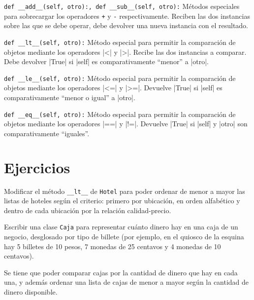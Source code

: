 \begin{referencia_python}
\begin{sintaxis}{\lstinline!def __add__(self, otro):, def __sub__(self, otro):!}
Métodos especiales para sobrecargar los operadores \lstinline!+! y
\lstinline!-! respectivamente.  Reciben las dos instancias sobre las
que se debe operar, debe devolver una nueva instancia con el
resultado.
\end{sintaxis}

\begin{sintaxis}{\lstinline!def __lt__(self, otro):!}
Método especial para permitir la comparación de objetos mediante los
operadores |<| y |>|.  Recibe las dos instancias a
comparar. Debe devolver |True| si |self| es comparativamente
``menor'' a |otro|.
\end{sintaxis}

\begin{sintaxis}{\lstinline!def __le__(self, otro):!}
Método especial para permitir la comparación de objetos mediante los
operadores |<=| y |>=|. Devuelve |True| si |self| es comparativamente
``menor o igual'' a |otro|.
\end{sintaxis}

\begin{sintaxis}{\lstinline!def __eq__(self, otro):!}
Método especial para permitir la comparación de objetos mediante los operadores
|==| y |!=|. Devuelve |True| si |self| y |otro| son comparativamente
``iguales''.
\end{sintaxis}

\end{referencia_python}

\newpage
\section{Ejercicios}

\begin{ejercicio}
Modificar el método \lstinline!__lt__! de \lstinline!Hotel!
para poder ordenar de menor a mayor las listas de hoteles según el criterio:
primero por ubicación, en orden alfabético y dentro de cada ubicación por
la relación calidad-precio.
\end{ejercicio}

\begin{ejercicio}
Escribir una clase \lstinline!Caja! para representar cuánto
dinero hay en una caja de un negocio, desglosado por tipo de billete (por
ejemplo, en el quiosco de la esquina hay 5 billetes de 10 pesos, 7 monedas
de 25 centavos y 4 monedas de 10 centavos).

Se tiene que poder comparar cajas por la cantidad de dinero que
hay en cada una, y además ordenar una lista de cajas
de menor a mayor según la cantidad de dinero disponible.
\end{ejercicio}


